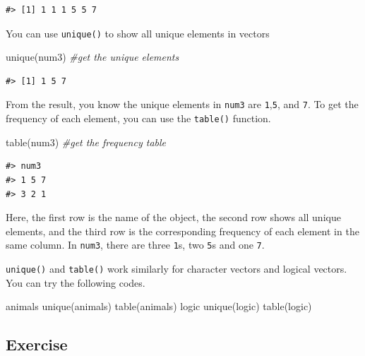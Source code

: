 \documentclass[
]{book}
\newenvironment{Shaded}{\begin{snugshade}}{\end{snugshade}}
\newcommand{\CommentTok}[1]{\textcolor[rgb]{0.56,0.35,0.01}{\textit{#1}}}
\newcommand{\FunctionTok}[1]{\textcolor[rgb]{0.00,0.00,0.00}{#1}}
\newcommand{\NormalTok}[1]{#1}
\begin{document}
\begin{verbatim}
#> [1] 1 1 1 5 5 7
\end{verbatim}

You can use \texttt{unique()} to show all unique elements in vectors

\begin{Shaded}
\begin{Highlighting}[]
\FunctionTok{unique}\NormalTok{(num3)   }\CommentTok{\#get the unique elements}
\end{Highlighting}
\end{Shaded}

\begin{verbatim}
#> [1] 1 5 7
\end{verbatim}

From the result, you know the unique elements in \texttt{num3} are \texttt{1},\texttt{5}, and \texttt{7}. To get the frequency of each element, you can use the \texttt{table()} function.

\begin{Shaded}
\begin{Highlighting}[]
\FunctionTok{table}\NormalTok{(num3)    }\CommentTok{\#get the frequency table}
\end{Highlighting}
\end{Shaded}

\begin{verbatim}
#> num3
#> 1 5 7 
#> 3 2 1
\end{verbatim}

Here, the first row is the name of the object, the second row shows all unique elements, and the third row is the corresponding frequency of each element in the same column. In \texttt{num3}, there are three \texttt{1}s, two \texttt{5}s and one \texttt{7}.

\texttt{unique()} and \texttt{table()} work similarly for character vectors and logical vectors. You can try the following codes.

\begin{Shaded}
\begin{Highlighting}[]
\NormalTok{animals}
\FunctionTok{unique}\NormalTok{(animals)}
\FunctionTok{table}\NormalTok{(animals)}
\NormalTok{logic}
\FunctionTok{unique}\NormalTok{(logic)}
\FunctionTok{table}\NormalTok{(logic)}
\end{Highlighting}
\end{Shaded}

\hypertarget{exercise-3}{%
\subsection{Exercise}\label{exercise-3}}
\end{document}

